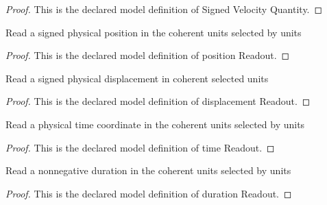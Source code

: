\begin{proof}
  This is the declared model definition of Signed Velocity Quantity.
\end{proof}
\begin{definition}
  \label{def:physics:phyx-mini-0829:phyxminiproblems-problemphyxmini0829-positionreadout}
  Read a signed physical position in the coherent units selected by units
\end{definition}
\begin{proof}
  This is the declared model definition of position Readout.
\end{proof}
\begin{definition}
  \label{def:physics:phyx-mini-0829:phyxminiproblems-problemphyxmini0829-displacementreadout}
  Read a signed physical displacement in coherent selected units
\end{definition}
\begin{proof}
  This is the declared model definition of displacement Readout.
\end{proof}
\begin{definition}
  \label{def:physics:phyx-mini-0829:phyxminiproblems-problemphyxmini0829-timereadout}
  Read a physical time coordinate in the coherent units selected by units
\end{definition}
\begin{proof}
  This is the declared model definition of time Readout.
\end{proof}
\begin{definition}
  \label{def:physics:phyx-mini-0829:phyxminiproblems-problemphyxmini0829-durationreadout}
  Read a nonnegative duration in the coherent units selected by units
\end{definition}
\begin{proof}
  This is the declared model definition of duration Readout.
\end{proof}
